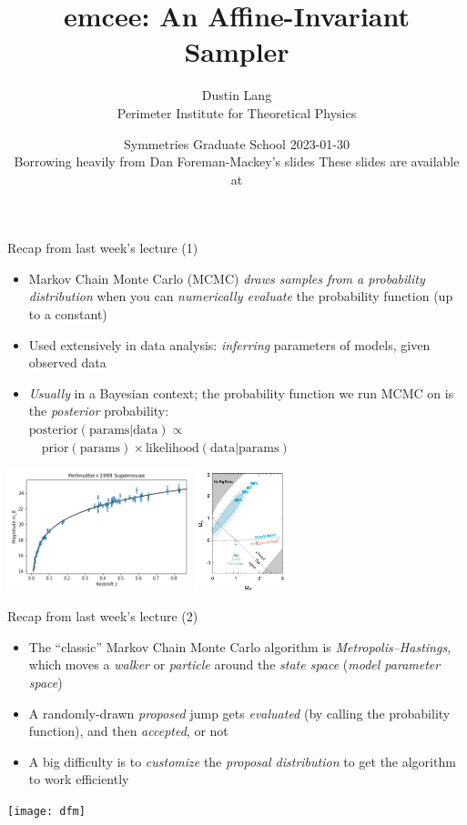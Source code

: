 \documentclass{beamer}
\title{emcee: An Affine-Invariant Sampler}
\author{Dustin Lang \\
Perimeter Institute for Theoretical Physics}
\date{Symmetries Graduate School 2023-01-30 \\
  \vspace{1em}
Borrowing heavily from Dan Foreman-Mackey's slides \niceurl{https://speakerdeck.com/dfm/data-analysis-with-mcmc1}
  \vspace{1em}
These slides are available at \niceurl{https://github.com/dstndstn/MCMC-talk}%
}
\begin{document}
\begin{frame}
\titlepage
\end{frame}

\begin{frame}{Recap from last week's lecture (1)}
\begin{itemize}
\addtolength{\itemsep}{0.5em}
\item Markov Chain Monte Carlo (MCMC) 
\emph{draws samples from a probability distribution}
when you can \emph{numerically evaluate} the probability function
(up to a constant)
\item Used extensively in data analysis:
\emph{inferring} parameters of models, given observed data
\item \emph{Usually} in a Bayesian context; the probability function we
run MCMC on is the \emph{posterior} probability: \\
$\textrm{posterior}(\textrm{params} | \textrm{data}) \propto$ \\
$\quad \textrm{prior}(\textrm{params}) \times \textrm{likelihood}(\textrm{data} | \textrm{params})$
\end{itemize}

\vspace{-0.5em}
\centering
\includegraphics[valign=t,width=0.4\textwidth]{pm2}
\hspace{0.1\textwidth}
\includegraphics[valign=t,width=0.2\textwidth]{pm-constraints}
\end{frame}
 

\begin{frame}{Recap from last week's lecture (2)}
\begin{itemize}
\addtolength{\itemsep}{1em}
\item The ``classic'' Markov Chain Monte Carlo algorithm is
\emph{Metropolis--Hastings}, which moves a \emph{walker} or \emph{particle}
around the \emph{state space} (\emph{model parameter space})
\item A randomly-drawn \emph{proposed} jump gets \emph{evaluated} (by calling
the probability function), and then \emph{accepted}, or not
\item A big difficulty is to \emph{customize} the \emph{proposal distribution}
to get the algorithm to work efficiently
\end{itemize}

\vspace{-0.5em}
\centering
\texttt{[image: dfm]}
\end{frame}
\end{document}
